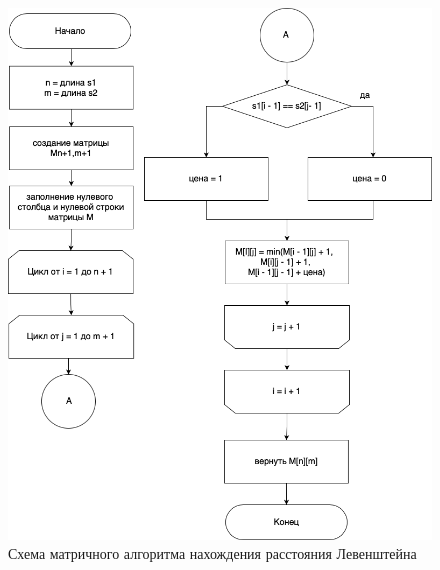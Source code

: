 \documentclass[a4paper,14pt, unknownkeysallowed]{extreport}
\begin{document}
\begin{figure}[h]
	\centering
	\includegraphics[scale=0.6]{img/lev_table_scheme.png}
	\caption{Схема матричного алгоритма нахождения расстояния Левенштейна}
	\label{fig:L_table}
\end{figure}

\clearpage
\end{document}
